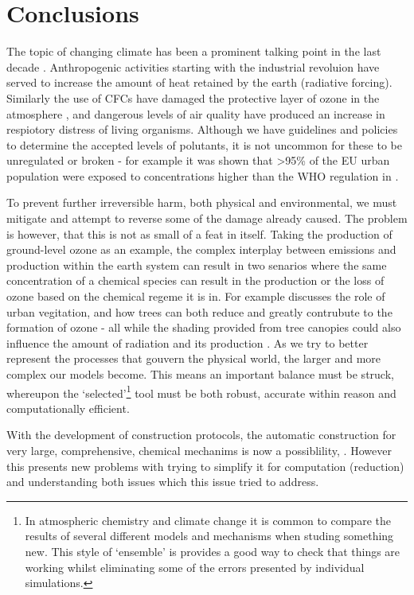 \section{Conclusions}


The topic of changing climate has been a prominent talking point in the last decade \citep{IPCC2013Science}. Anthropogenic activities starting with the industrial revoluion have served to increase the amount of heat retained by the earth (radiative forcing). Similarly the use of CFCs have damaged the protective layer of ozone in the atmosphere \citep{o3damage}, and dangerous levels of air quality have produced an increase in respiotory distress of living organisms. Although we have guidelines and policies to determine the accepted levels of polutants, it is not uncommon for these to be unregulated or broken - for example it was shown that >95\% of the EU urban population were exposed to concentrations higher than the WHO regulation in \citep{eea}.

To prevent further irreversible harm, both physical and environmental, we must mitigate and attempt to reverse some of the damage already caused. The problem is however, that this is not as small of a feat in itself. Taking the production of ground-level ozone as an example, the complex interplay between emissions and production within the earth system can result in two senarios where the same concentration of a chemical species can result in the production or the loss of ozone based on the chemical regeme it is in. For example \cite{reviewo3} discusses the role of urban vegitation, and how trees can both reduce \citep{losso3} and greatly contrubute to the formation \citep{isopmcm} of ozone - all while the shading provided from tree canopies could also influence the amount of radiation and its production \citep{shady}. As we try to better represent the  processes that gouvern the physical world, the larger and more complex our models become. This means an important balance must be struck, whereupon the `selected'\footnote{In atmospheric chemistry and climate change it is common to compare the results of several different models and mechanisms when studing something new. This style of `ensemble' is provides a good way to check that things are working whilst eliminating some of the errors presented by individual simulations.} tool must be both robust, accurate within reason and computationally efficient.

With the development of construction protocols, the automatic construction for very large, comprehensive, chemical mechanims is now a possiblility, \citep{gecko}. However this presents new problems with trying to simplify it for computation (reduction) and understanding both issues which this issue tried to address.

